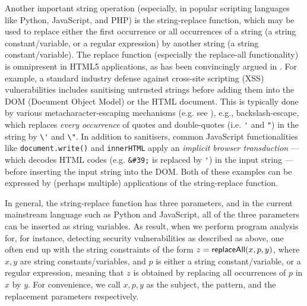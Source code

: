 Another important string operation (especially, in popular scripting
languages like Python, JavaScript, and PHP) is the string-replace function, 
which may be used to replace either the first occurrence or
all occurrences of a string (a string constant/variable, or a regular expression) by 
another string (a string constant/variable). The replace function (especially 
the replace-all functionality) is omnipresent in HTML5 applications, as has
been convincingly argued in \cite{LB16,TCJ16,YABI14}. For
example, a standard industry defense against cross-site scripting 
(XSS) vulnerabilities includes sanitising untrusted strings before adding them
into the DOM (Document Object Model) or the HTML document. 
This is typically done by %
various metacharacter-escaping mechanisms (e.g. see 
\cite{Kern14,BEK,OWASP-XSS}), e.g., backslash-escape, which replaces \emph{every
occurrence} of quotes and double-quotes (i.e. \verb+'+ and \verb+"+) in the
string by \verb+\'+ and \verb+\"+. 
In addition
to sanitisers, common JavaScript functionalities like \texttt{document.write()} 
and \texttt{innerHTML} apply an \emph{implicit browser transduction} --- which
decodes HTML codes (e.g. \verb+&#39;+ is replaced by \verb+'+) in the input 
string --- before inserting the input string into the DOM.
Both of these examples can be expressed by (perhaps multiple) 
applications of the string-replace function.



In general, the string-replace function has three parameters, and in the current mainstream language such as Python and JavaScript, all of the three parameters can be inserted as string variables. As result, when we perform program analysis for, for instance, detecting security vulnerabilities as described as above, one often end up with the string constraints of the form $z= \mathsf{replaceAll}(x, p, y)$, where $x,y$ are string constants/variables, and $p$ is either a string constant/variable, or a regular expression, meaning that $z$ is obtained by replacing all occurrences of $p$ in $x$ by $y$. For convenience, we call $x, p, y$ as the subject, the pattern, and the replacement parameters respectively. 


